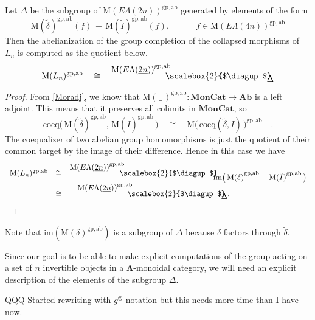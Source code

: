 \documentclass{amsbook} %
\newcommand{\mb}{\mathbf}
\newcommand{\ML}{\mathbf{\Lambda}}
\newcommand{\bigquotient}[2]{ \raisebox{0.75\height}{$#1$} \mkern-12mu\scalebox{2}{$\diagup$}\mkern-10mu \raisebox{-0.5\height}{$#2$} }
\newcommand{\ELnn}{E\Lambda(\underline{2n})}
\newcommand{\ELnnnn}{E\Lambda(\underline{4n})}
\newcommand{\moncat}{\ensuremath{\mb{MonCat}}}
\numberwithin{section}{chapter}
\begin{document}
\begin{prop}\label{Zmor2} Let $\Delta$ be the subgroup of $\mathrm{M}(\ELnn)^{\mathrm{gp, ab}}$ generated by elements of the form
\[ \mathrm{M}(\tilde{\delta})^{\mathrm{gp, ab}}(f) \, - \, \mathrm{M}(\tilde{I})^{\mathrm{gp, ab}}(f), \quad \quad \quad f \in \mathrm{M}(\ELnnnn)^{\mathrm{gp, ab}} \]
Then the abelianization of the group completion of the collapsed morphisms of $L_n$ is computed as the quotient below.
\[ \mathrm{M}(L_{n})^{\mathrm{gp, ab}} \quad \cong \quad \bigquotient{{\mathrm{M}(\ELnn)}^{\mathrm{gp, ab}}}{\Delta} \]
\end{prop}
\begin{proof}
From \cref{Moradj}, we know that $\mathrm{M}(\, \_ \,)^{\mathrm{gp, ab}} \colon  \moncat \to \mb{Ab}$ is a left adjoint. This means that it preserves all colimits in $\moncat$, so
\[ \mathrm{coeq}\big( \, \mathrm{M}(\tilde{\delta})^{\mathrm{gp, ab}}, \, \mathrm{M}(\tilde{I})^{\mathrm{gp, ab}} \, \big) \quad \cong \quad \mathrm{M}\big( \, \mathrm{coeq}(\tilde{\delta}, \tilde{I}) \, \big)^{\mathrm{gp, ab}} \quad. \]
The coequalizer of two abelian group homomorphisms is just the quotient of their common target by the image of their difference. Hence in this case we have
\[ 
\begin{array}{rcl}
\mathrm{M}(L_{n})^{\mathrm{gp, ab}}  & \cong &  \bigquotient{{\mathrm{M}(\ELnn)}^{\mathrm{gp, ab}}}{\mathrm{im}\big( \, {\mathrm{M}(\tilde{\delta})}^{\mathrm{gp, ab}} - {\mathrm{M}(\tilde{I})}^{\mathrm{gp, ab}} \, \big)} \\
& \cong & \quad \bigquotient{{\mathrm{M}(\ELnn)}^{\mathrm{gp, ab}}}{\Delta}.
\end{array}
\]
\end{proof} 

\begin{rem}\label{delta_neq_image}
Note that $\mathrm{im}(\mathrm{M}(\delta)^{\mathrm{gp, ab}})$ is a subgroup of $\Delta$ because $\delta$ factors through $\tilde{\delta}$.
\end{rem}




Since our goal is to be able to make explicit computations of the group acting on a set of $n$ invertible objects in a $\ML$-monoidal category, we will need an explicit description of the elements of the subgroup $\Delta$.

QQQ Started rewriting with $g^{\otimes}$ notation but this needs more time than I have now.
\end{document}
